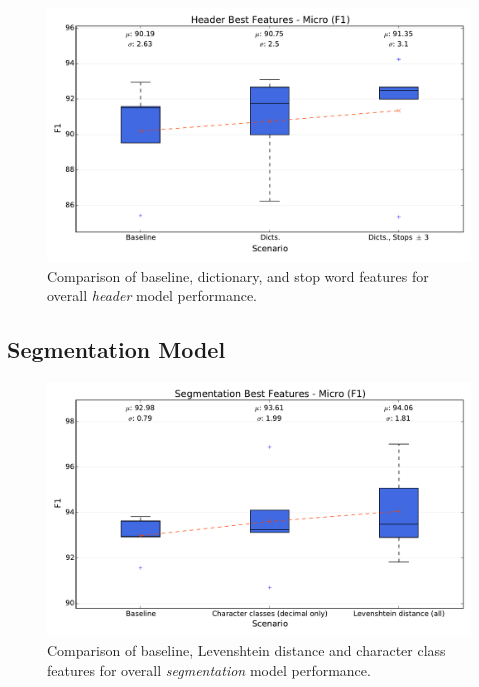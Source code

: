 \begin{figure}[h]
\center
\includegraphics[width=5.5in]{Figures/micro_header.pdf}
\caption{Comparison of baseline, dictionary, and stop word features for overall \emph{header} model performance.}
\label{fig:micro_header}
\end{figure}

\subsection{Segmentation Model}

\begin{figure}[h]
\center
\includegraphics[width=5.5in]{Figures/micro_segmentation.pdf}
\caption{Comparison of baseline, Levenshtein distance and character class features for overall \emph{segmentation} model performance.}
\label{fig:micro_segmentation}
\end{figure}


